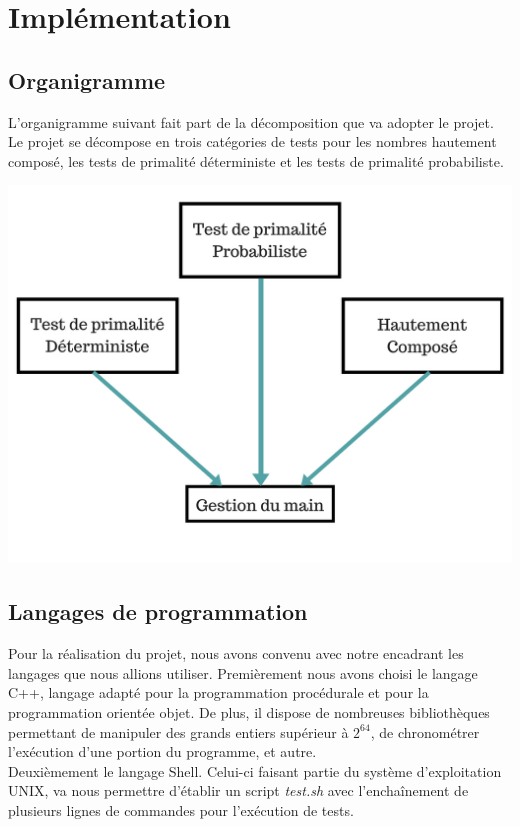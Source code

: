 	\section{Implémentation}
			\subsection{Organigramme}
		L'organigramme suivant fait part de la décomposition que va adopter le projet. Le projet se décompose en trois catégories de tests pour les nombres hautement composé, les tests de primalité déterministe et les tests de primalité probabiliste. \\ 
		\begin{center}\includegraphics[scale=0.5]{organigramme.png}\end{center}
		
		
		\subsection{Langages de programmation}
		Pour la réalisation du projet, nous avons convenu avec notre encadrant les langages que nous allions utiliser. Premièrement nous avons choisi le langage C++, langage adapté pour la programmation procédurale et pour la programmation orientée objet. De plus, il dispose de nombreuses bibliothèques permettant de manipuler des grands entiers supérieur à $2^{64}$, de chronométrer l'exécution d'une portion du programme, et autre.\\
		Deuxièmement le langage Shell. Celui-ci faisant partie du système d'exploitation UNIX, va nous permettre d'établir un script \textit{test.sh} avec l’enchaînement de plusieurs lignes de commandes pour l'exécution de tests.
		
